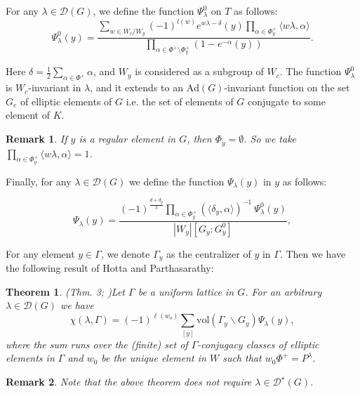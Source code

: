 \documentclass[11 pt]{amsart}
\newtheorem{theorem}{Theorem}[section]
\theoremstyle{definition}
\newtheorem{remark}{Remark}[section]
\numberwithin{equation}{section}
\begin{document}
\vspace{5pt}

\noindent For any $\lambda \in \mathcal{D}(G)$, we define the function $\Psi_{\lambda}^0$ on $T$ as follows: 
$$\Psi_{\lambda}^0(y)= \dfrac{\sum\limits_{w \in W_c/W_y} (-1)^{l(w)} e^{w \lambda -\delta} (y) \prod\limits_{\alpha \in \Phi_y^+} \langle w \lambda , \alpha \rangle}{\prod\limits_{\alpha \in \Phi^+ \setminus \Phi_y^+} (1 - e^{-\alpha}(y))}.$$

\noindent Here $\delta=\frac{1}{2}\sum\limits_{\alpha \in \Phi^+} \alpha$, and $W_y$ is considered as a subgroup of $W_c$. The function $\Psi_{\lambda}^0$ is $W_c$-invariant in $\lambda$, and it extends to an $\text{Ad}(G)$-invariant function on the set $G_e$ of elliptic elements of $G$ i.e. the set of elements of $G$ conjugate to some element of $K$. 

\begin{remark}
\textit{If $y$ is a regular element in $G$, then $\Phi_y=\emptyset$. So we take $\prod\limits_{\alpha \in \Phi_y^+} \langle w \lambda , \alpha \rangle=1$.}
\end{remark}

\noindent Finally, for any $\lambda \in \mathcal{D}(G)$ we define the function $\Psi_{\lambda}(y)$ in $y$ as follows: 

$$\Psi_{\lambda}(y)=\dfrac{ (-1)^{\frac{d + d_y}{2}} \prod\limits_{\alpha \in \Phi_y^+} (\langle \delta_y, \alpha \rangle)^{-1}\ \Psi_{\lambda}^0(y)}{|W_y| [G_y : G_y^0] },$$


\noindent For any element $y \in \Gamma$, we denote $\Gamma_y$ as the centralizer of $y$ in $\Gamma$. Then we have the following result of Hotta and Parthasarathy:

\begin{theorem}(Thm. 3; \cite{HP})\label{thm5}
\textit{Let $\Gamma$ be a uniform lattice in $G$. For an arbitrary $\lambda \in \mathcal{D}(G)$ we have $$\chi(\lambda, \Gamma)= (-1)^{\ell(w_o)}\sum\limits_{[y]} \text{vol} (\Gamma_y \backslash G_y) \Psi_{\lambda}(y),$$ where the sum runs over the (finite) set of $\Gamma$-conjugacy classes of elliptic elements in $\Gamma$ and $w_0$ be the unique element in $W$ such that $w_0 \Phi^+ = P^{\lambda}$.} 
\end{theorem}



\begin{remark}
\textit{Note that the above theorem does not require $\lambda \in \mathcal{D}^{\star}(G)$.} 
\end{remark}
\end{document}
